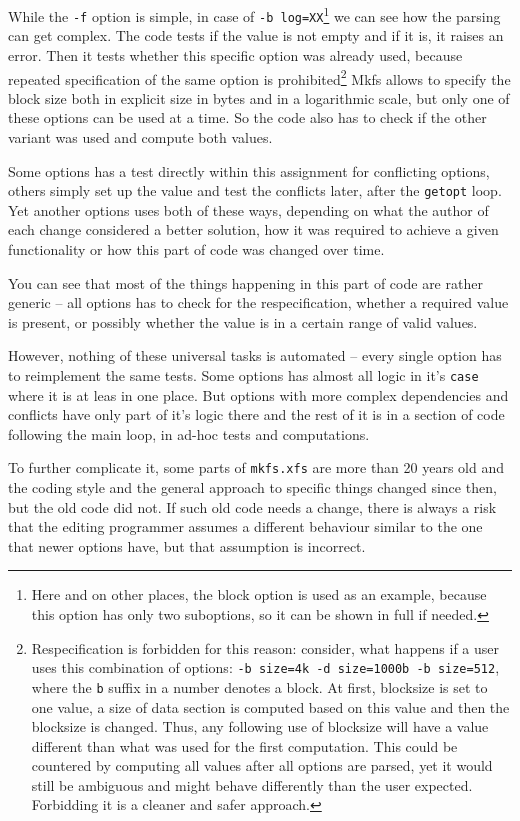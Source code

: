 While the {\tt -f} option is simple, in case of {\tt -b
log=XX}\footnote{Here and on other places, the block option is used as an
example, because this option has only two suboptions, so it can be shown in
full if needed.} we can see how the parsing can get complex. The code tests
if the value is not empty and if it is, it raises an error. Then it tests
whether this specific option was already used, because repeated
specification of the same option is prohibited\footnote{Respecification is
	forbidden for this reason: consider, what happens if a user uses
	this combination of options: {\tt  -b size=4k -d size=1000b -b
	size=512}, where the {\tt b} suffix in a number denotes a block. At
	first, blocksize is set to one value, a size of data section is
	computed based on this value and then the blocksize is changed.
	Thus, any following use of blocksize will have a value different
	than what was used for the first computation. This could be
	countered by computing all values after all options are parsed, yet
	it would still be ambiguous and might behave differently than the
	user expected. Forbidding it is a cleaner and safer approach.} Mkfs
	allows to specify the block size both in explicit size in bytes and
	in a logarithmic scale, but only one of these options can be used
	at a time. So the code also has to check if the other variant was
	used and compute both values.

Some options has a test directly within this assignment for conflicting
options, others simply set up the value and test the conflicts later, after
the {\tt getopt} loop. Yet another options uses both of these ways, depending on what the author of
each change considered a better solution, how it was required to achieve a given
functionality or how this part of code was changed over time.

You can see that most of the things happening in this part of code are
rather generic -- all options has to check for the respecification, whether
a required value is present, or possibly whether the value is in a certain
range of valid values.

However, nothing of these universal tasks is automated -- every single
option has to reimplement the same tests. Some options has almost all logic
in it's {\tt case} where it is at leas in one place. But options with more
complex dependencies and conflicts have only part of it's logic there and
the rest of it is in a section of code following the main loop, in ad-hoc
tests and computations.

To further complicate it, some parts of {\tt mkfs.xfs} are more than 20
years old and the coding style and the general approach to specific things
changed since then, but the old code did not. If such old code needs a
change, there is always a risk that the editing programmer assumes a
different behaviour similar to the one that newer options have, but that
assumption is incorrect.


